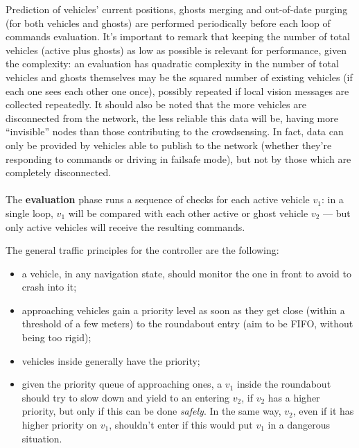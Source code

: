 Prediction of vehicles' current positions, ghosts merging and out-of-date
purging (for both vehicles and ghosts) are performed periodically before each
loop of commands evaluation. It's important to remark that keeping the number of
total vehicles (active plus ghosts) as low as possible is relevant for
performance, given the complexity: an evaluation has quadratic complexity in the
number of total vehicles and ghosts themselves may be the squared number of
existing vehicles (if each one sees each other one once), possibly repeated if
local vision messages are collected repeatedly. It should also be noted that the
more vehicles are disconnected from the network, the less reliable this data
will be, having more ``invisible'' nodes than those contributing to the
crowdsensing. In fact, data can only be provided by vehicles able to publish to
the network (whether they're responding to commands or driving in failsafe
mode), but not by those which are completely disconnected.
\\
\\
The \textbf{evaluation} phase runs a sequence of checks for each active vehicle
$v_1$: in a single loop, $v_1$ will be compared with each other active or ghost
vehicle $v_2$ --- but only active vehicles will receive the resulting commands.

The general traffic principles for the controller are the following:
\begin{itemize}
  \item a vehicle, in any navigation state, should monitor the one in front to
  avoid to crash into it;
  \item approaching vehicles gain a priority level as soon as they get close 
  (within a threshold of a few meters) to the roundabout entry (aim to be FIFO,
  without being too rigid);
  \item vehicles inside generally have the priority;
  \item given the priority queue of approaching ones, a $v_1$ inside the
  roundabout should try to slow down and yield to an entering $v_2$, if $v_2$
  has a higher priority, but only if this can be done \textit{safely}. In the
  same way, $v_2$, even if it has higher priority on $v_1$, shouldn't enter if
  this would put $v_1$ in a dangerous situation.
\end{itemize}

